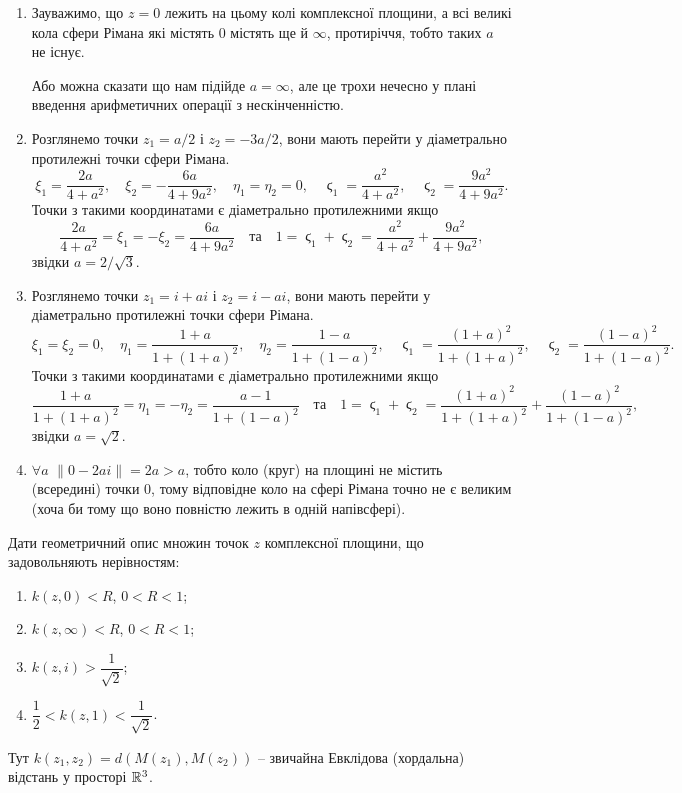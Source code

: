 \begin{solution}
    \begin{enumerate}
        \item Зауважимо, що $z = 0$ лежить на цьому колі комплексної площини, а всі великі кола сфери Рімана які містять 0 містять ще й $\infty$, протиріччя, тобто таких $a$ не існує.
        \begin{side_comment}
            Або можна сказати що нам підійде $a = \infty$, але це трохи нечесно у плані введення арифметичних операції з нескінченністю.
        \end{side_comment}
        \item Розглянемо точки $z_1 = a / 2$ і $z_2 = - 3 a / 2$, вони мають перейти у діаметрально протилежні точки сфери Рімана.
        \[\xi_1 = \dfrac {2 a} {4 + a^2}, \quad \xi_2 = -\dfrac{6 a}{4 + 9 a^2}, \quad \eta_1 = \eta_2 = 0, \quad \stigma_1 = \dfrac{a^2}{4 + a^2}, \quad \stigma_2 = \dfrac{9 a^2}{4 + 9 a^2}.\]
        Точки з такими координатами є діаметрально протилежними якщо 
        \[ \dfrac {2 a} {4 + a^2} = \xi_1 = - \xi_2 = \dfrac{6 a}{4 + 9 a^2} \quad \text{та} \quad 1 = \stigma_1 + \stigma_2 = \dfrac{a^2}{4 + a^2} + \dfrac{9 a^2}{4 + 9 a^2}, \]
        звідки $a = 2 / \sqrt 3$.
        \item Розглянемо точки $z_1 = i + a i $ і $z_2 = i - a i$, вони мають перейти у діаметрально протилежні точки сфери Рімана.
        \[\xi_1 = \xi_2 = 0, \quad \eta_1 = \dfrac{1 + a}{1 + (1 + a)^2}, \quad \eta_2 = \dfrac{1 - a}{1 + (1 - a)^2}, \quad \stigma_1 = \dfrac{(1 + a)^2}{1 + (1 + a)^2}, \quad \stigma_2 = \dfrac{(1 - a)^2}{1 + (1 - a)^2}.\]
        Точки з такими координатами є діаметрально протилежними якщо 
        \[ \dfrac{1 + a}{1 + (1 + a)^2} = \eta_1 = - \eta_2 = \dfrac{a - 1}{1 + (1 - a)^2} \quad \text{та} \quad 1 = \stigma_1 + \stigma_2 = \dfrac{(1 + a)^2}{1 + (1 + a)^2} + \dfrac{(1 - a)^2}{1 + (1 - a)^2},\]
        звідки $a = \sqrt 2$.
        \item $\forall a$ $\| 0 - 2ai \| = 2a > a$, тобто коло (круг) на площині не містить (всередині) точки 0, тому відповідне коло на сфері Рімана точно не є великим (хоча би тому що воно повністю лежить в одній напівсфері).
    \end{enumerate}
\end{solution}

\begin{problem}[1.45, Евграфов]
    Дати геометричний опис множин точок $z$ комплексної площини, що задовольняють нерівностям:
    \begin{enumerate}
        \item $k(z, 0) < R$, $0 < R < 1$;
        \item $k(z, \infty) < R$, $0 < R < 1$;
        \item $k(z, i) > \dfrac 1 {\sqrt 2}$;
        \item $\dfrac 1 2 < k(z, 1) < \dfrac 1 {\sqrt 2}$.
    \end{enumerate}
    Тут $k(z_1, z_2) = d(M(z_1), M(z_2))$ -- звичайна Евклідова (хордальна) відстань у просторі $\mathbb{R}^3$.
\end{problem}

